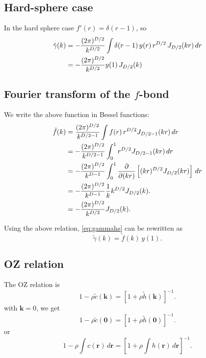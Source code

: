 \documentclass[preprint]{revtex4-1}
\numberwithin{equation}{subsection}
\numberwithin{table}{section}
\newcommand{\vct}[1]{\mathbf{#1}}
\providecommand{\vr}{} %
\renewcommand{\vr}{\vct{r}}
\newcommand{\vk}{\vct{k}}
\begin{document}
\subsection{Hard-sphere case}

In the hard sphere case $f'(r) = \delta(r - 1)$,
so
\begin{align}
\tilde{\gamma}(k)
&=-\frac{(2\pi)^{D/2}}{k^{D/2}}
\int \delta(r - 1) \, y(r) \, r^{D/2} \, J_{D/2}(kr) \, dr
\notag \\
&=-\frac{(2\pi)^{D/2}}{k^{D/2}}
y(1) \, J_{D/2}(k)
\label{eq:gammahs}
\end{align}



\subsection{Fourier transform of the $f$-bond}

We write the above function in Bessel functions:
\begin{align}
  \tilde{f}(k)
&=
\frac{(2\pi)^{D/2}}{k^{D/2-1}}
\int f(r) \, r^{D/2} J_{D/2-1}(kr) \, dr
\notag \\
&=
-\frac{(2\pi)^{D/2}}{k^{D/2-1}}
\int_0^1 r^{D/2} J_{D/2-1}(kr) \, dr
\notag \\
&=
-\frac{(2\pi)^{D/2}}{k^{D-1}}
\int_0^1 \frac{\partial}{\partial (kr)}
\left[(kr)^{D/2} J_{D/2}(kr) \right] \, dr
\notag \\
&=
-\frac{(2\pi)^{D/2}}{k^{D-1}} \frac{1}{k}
k^{D/2} J_{D/2}(k).
\notag \\
&=
-\frac{(2\pi)^{D/2}}{k^{D/2}} J_{D/2}(k).
\end{align}


Using the above relation, \eqref{eq:gammahs}
can be rewritten as
\[
  \tilde{\gamma}(k) = \tilde{f}(k) \, y(1).
\]




\subsection{OZ relation}

The OZ relation is
\begin{equation}
  1 - \rho \tilde c(\vk)
=
 [1 + \rho \tilde h(\vk)]^{-1}.
 \label{eq:ozsymm}
\end{equation}
%
with $\vk = 0$, we get
\[
  1 - \rho \tilde c(\vct 0)
=
 [1 + \rho \tilde h(\vct 0)]^{-1}.
\]
or
\begin{equation}
  1 - \rho \int c(\vr) \, d\vr
=
 \left[1 + \rho \int h(\vr) \, d\vr \right]^{-1}.
 \label{eq:ozr}
\end{equation}
\end{document}
